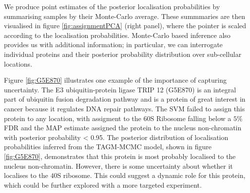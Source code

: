 \documentclass[12pt,english]{article}\usepackage[]{graphicx}\usepackage[]{color}
\begin{document}
We produce point estimates of the posterior localisation probabilities
by summarising samples by their Monte-Carlo average.  These summmaries
are then visualised in figure \ref{fig:assignmentPCA} (right panel),
where the pointer is scaled according to the localisation
probabilities. Monte-Carlo based inference also provides us with
additional information; in particular, we can interrogate individual
proteins and their posterior probability distribution over
sub-cellular locations.

Figure \ref{fig:G5E870} illustrates one example of the importance of
capturing uncertainty.  The E3 ubiquitin-protein ligase TRIP 12
(G5E870) is an integral part of ubiquitin fusion degradation pathway
and is a protein of great interest in cancer because it regulates DNA
repair pathways. The SVM failed to assign this protein to any
location, with assigment to the 60S Ribosome falling below a $5\%$ FDR
and the MAP estimate assigned the protein to the nucleus non-chromatin
with posterior probability < 0.95.  The posterior distribution of
localisation probabilities inferred from the TAGM-MCMC model, shown in
figure \ref{fig:G5E870}, demonstrates that this protein is most
probably localised to the nucleus non-chromatin. However, there is
some uncertainty about whether it localises to the $40$S ribosome.
This could suggest a dynamic role for this protein, which could be
further explored with a more targeted experiment.
\end{document}
